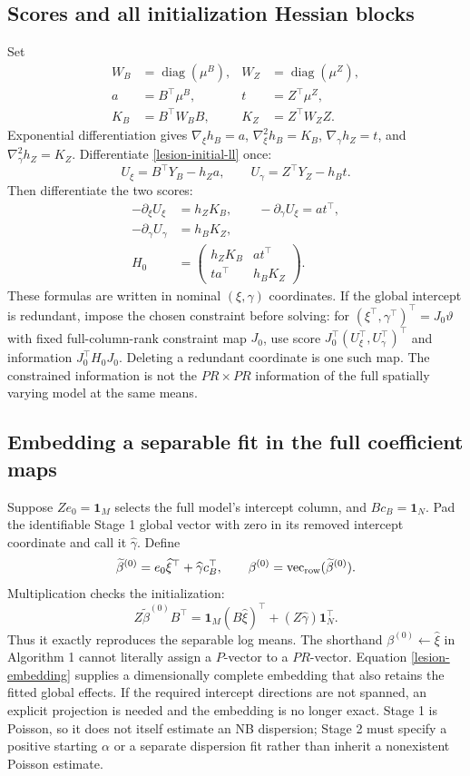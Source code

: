 \documentclass[11pt,a4paper]{article}
\newcommand{\diag}{\operatorname{diag}}
\newcommand{\vr}{\operatorname{vec}_{\rm row}}
\numberwithin{equation}{section}
\begin{document}
\subsection{Scores and all initialization Hessian blocks}
Set
\begin{align*}
 W_B&=\diag(\mu^B),& W_Z&=\diag(\mu^Z),\\
 a&=B^\top\mu^B,& t&=Z^\top\mu^Z,\\
 K_B&=B^\top W_BB,& K_Z&=Z^\top W_ZZ.
\end{align*}
Exponential differentiation gives
$\nabla_\xi h_B=a$, $\nabla_\xi^2h_B=K_B$,
$\nabla_\gamma h_Z=t$, and $\nabla_\gamma^2h_Z=K_Z$.
Differentiate \eqref{lesion-initial-ll} once:
\[
 U_\xi=B^\top Y_B-h_Za,\qquad
 U_\gamma=Z^\top Y_Z-h_Bt.
\]
Then differentiate the two scores:
\begin{align}
 -\partial_\xi U_\xi&=h_ZK_B,\qquad
 -\partial_\gamma U_\xi=a t^\top,\\
 -\partial_\gamma U_\gamma&=h_BK_Z,\\
 H_0&=\begin{pmatrix}h_ZK_B&a t^\top\\t a^\top&h_BK_Z\end{pmatrix}.
\end{align}
These formulas are written in nominal $(\xi,\gamma)$ coordinates.
If the global intercept is redundant, impose the chosen constraint
before solving: for $(\xi^\top,\gamma^\top)^\top=J_0\vartheta$
with fixed full-column-rank constraint map $J_0$, use score
$J_0^\top(U_\xi^\top,U_\gamma^\top)^\top$ and information
$J_0^\top H_0J_0$. Deleting a redundant coordinate is one such map.
The constrained information is not the $PR\times PR$ information
of the full spatially varying model at the same means.

\subsection{Embedding a separable fit in the full coefficient maps}
Suppose $Ze_0=\mathbf1_M$ selects the full model's intercept column,
and $Bc_B=\mathbf1_N$.
Pad the identifiable Stage 1 global vector with zero in its
removed intercept coordinate and call it $\widehat\gamma$.
Define
\begin{equation}
 \widetilde\beta^{(0)}=e_0\widehat\xi^\top+\widehat\gamma c_B^\top,\qquad
 \beta^{(0)}=\vr(\widetilde\beta^{(0)}).
 \label{lesion-embedding}
\end{equation}
Multiplication checks the initialization:
\[
 Z\widetilde\beta^{(0)}B^\top
 =\mathbf1_M(B\widehat\xi)^\top
           +(Z\widehat\gamma)\mathbf1_N^\top.
\]
Thus it exactly reproduces the separable log means.
The shorthand $\beta^{(0)}\leftarrow\widehat\xi$ in Algorithm 1
cannot literally assign a $P$-vector to a $PR$-vector.
Equation \eqref{lesion-embedding} supplies a dimensionally complete
embedding that also retains the fitted global effects.
If the required intercept directions are not spanned, an explicit
projection is needed and the embedding is no longer exact.
Stage 1 is Poisson, so it does not itself estimate an NB dispersion;
Stage 2 must specify a positive starting $\alpha$ or a separate
dispersion fit rather than inherit a nonexistent Poisson estimate.
\end{document}
